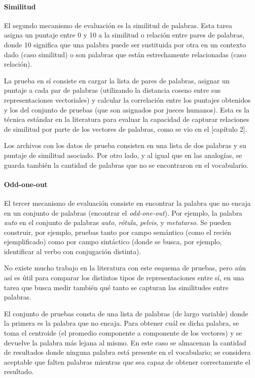 \paragraph{Similitud}

El segundo mecanismo de evaluación es la similitud de palabras. Esta tarea asigna un puntaje entre 0
y 10 a la similitud o relación entre pares de palabras, donde 10 significa que una palabra puede ser
sustituida por otra en un contexto dado (caso similitud) o son palabras que están estrechamente
relacionadas (caso relación).

La prueba en sí consiste en cargar la lista de pares de palabras, asignar un puntaje a cada par de
palabras (utilizando la distancia coseno entre sus representaciones vectoriales) y calcular la
correlación entre los puntajes obtenidos y los del conjunto de pruebas (que son asignados por jueces
humanos). Esta es la técnica estándar en la literatura para evaluar la capacidad de capturar
relaciones de similitud por parte de los vectores de palabras, como se vio en el [capítulo 2].

Los archivos con los datos de prueba consisten en una lista de dos palabras y su puntaje de
similitud asociado. Por otro lado, y al igual que en las analogías, se guarda también la cantidad de
palabras que no se encontraron en el vocabulario.


\paragraph{Odd-one-out}

El tercer mecanismo de evaluación consiste en encontrar la palabra que no encaja en un conjunto de
palabras (encontrar el \textit{odd-one-out}). Por ejemplo, la palabra \textit{auto} en el conjunto
de palabras \textit{auto}, \textit{rótula}, \textit{pelvis}, y \textit{metatarso}. Se pueden
construir, por ejemplo, pruebas tanto por campo semántico (como el recién ejemplificado) como por
campo sintáctico (donde se busca, por ejemplo, identificar al verbo con conjugación distinta).

No existe mucho trabajo en la literatura con este esquema de pruebas, pero aún así es útil para
comparar los distintos tipos de representaciones entre sí, en una tarea que busca medir también qué
tanto se capturan las similitudes entre palabras.

El conjunto de pruebas consta de una lista de palabras (de largo variable) donde la primera es la
palabra que no encaja. Para obtener cuál es dicha palabra, se toma el centroide (el promedio
componente a componente de los vectores) y se devuelve la palabra más lejana al mismo. En este caso
se almacenan la cantidad de resultados donde ninguna palabra está presente en el vocabulario; se
considera aceptable que falten palabras mientras que sea capaz de obtener correctamente el
resultado.


